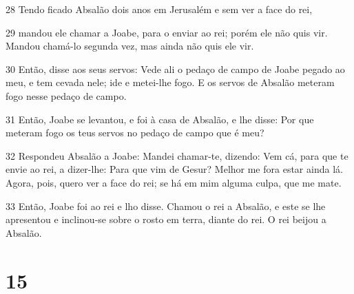 \par 28 Tendo ficado Absalão dois anos em Jerusalém e sem ver a face do rei,
\par 29 mandou ele chamar a Joabe, para o enviar ao rei; porém ele não quis vir. Mandou chamá-lo segunda vez, mas ainda não quis ele vir.
\par 30 Então, disse aos seus servos: Vede ali o pedaço de campo de Joabe pegado ao meu, e tem cevada nele; ide e metei-lhe fogo. E os servos de Absalão meteram fogo nesse pedaço de campo.
\par 31 Então, Joabe se levantou, e foi à casa de Absalão, e lhe disse: Por que meteram fogo os teus servos no pedaço de campo que é meu?
\par 32 Respondeu Absalão a Joabe: Mandei chamar-te, dizendo: Vem cá, para que te envie ao rei, a dizer-lhe: Para que vim de Gesur? Melhor me fora estar ainda lá. Agora, pois, quero ver a face do rei; se há em mim alguma culpa, que me mate.
\par 33 Então, Joabe foi ao rei e lho disse. Chamou o rei a Absalão, e este se lhe apresentou e inclinou-se sobre o rosto em terra, diante do rei. O rei beijou a Absalão.

\chapter{15}

